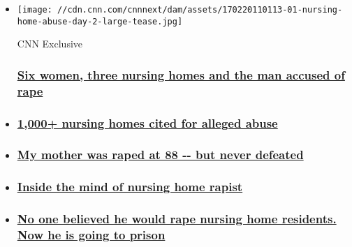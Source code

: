 \begin{itemize}
\item
  \href{http://www.cnn.com/interactive/2017/02/health/nursing-home-aide-rape-charges/}{}

  \texttt{[image: //cdn.cnn.com/cnnnext/dam/assets/170220110113-01-nursing-home-abuse-day-2-large-tease.jpg]}

  CNN Exclusive

  \hypertarget{six-women-three-nursing-homes-and-the-man-accused-of-rape}{%
  \subsubsection{\texorpdfstring{\href{http://www.cnn.com/interactive/2017/02/health/nursing-home-aide-rape-charges/}{Six
  women, three nursing homes and the man accused of
  rape}}{Six women, three nursing homes and the man accused of rape}}\label{six-women-three-nursing-homes-and-the-man-accused-of-rape}}
\item
  \hypertarget{1000-nursing-homes-cited-for-alleged-abuse}{%
  \subsubsection{\texorpdfstring{\href{http://www.cnn.com/interactive/2017/02/health/nursing-home-sex-abuse-investigation/}{1,000+
  nursing homes cited for alleged
  abuse}}{1,000+ nursing homes cited for alleged abuse}}\label{1000-nursing-homes-cited-for-alleged-abuse}}
\item
  \hypertarget{my-mother-was-raped-at-88----but-never-defeated}{%
  \subsubsection{\texorpdfstring{\href{/2017/02/22/opinions/nursing-home-rape-essay/index.html}{My
  mother was raped at 88 -\/- but never
  defeated}}{My mother was raped at 88 -\/- but never defeated}}\label{my-mother-was-raped-at-88----but-never-defeated}}
\item
  \hypertarget{inside-the-mind-of-nursing-home-rapist}{%
  \subsubsection{\texorpdfstring{\href{/videos/us/2017/02/17/nursing-home-sexual-assault-nieto-orig.cnn}{Inside
  the mind of nursing home
  rapist}}{Inside the mind of nursing home rapist}}\label{inside-the-mind-of-nursing-home-rapist}}
\item
  \hypertarget{no-one-believed-he-would-rape-nursing-home-residents-now-he-is-going-to-prison}{%
  \subsubsection{\texorpdfstring{\href{/2017/08/20/health/nursing-home-aide-rape-trial-guilty/index.html}{No
  one believed he would rape nursing home residents. Now he is going to
  prison}}{No one believed he would rape nursing home residents. Now he is going to prison}}\label{no-one-believed-he-would-rape-nursing-home-residents-now-he-is-going-to-prison}}
\end{itemize}


